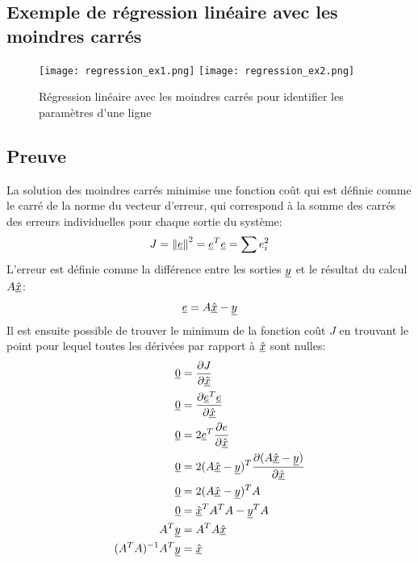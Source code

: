 \subsection{Exemple de régression linéaire avec les moindres carrés}

\begin{figure}[htbp]
	\centering
	\texttt{[image: regression\_ex1.png]}
	\texttt{[image: regression\_ex2.png]}
	\caption{Régression linéaire avec les moindres carrés pour identifier les paramètres d'une ligne}
	\label{fig:regression-ex1}
\end{figure}


\subsection{Preuve}

La solution des moindres carrés minimise une fonction coût qui est définie comme le carré de la norme du vecteur d'erreur, qui correspond à la somme des carrés des erreurs individuelles pour chaque sortie du système:
\begin{align}
	J = \left\| \underline{e} \right\|^2  = \underline{e}^T\underline{e} = \sum{ e_i^2}
\end{align}
L'erreur est définie comme la différence entre les sorties $\underline{y}$ et le résultat du calcul $A \underline{\hat{x}}$:
\begin{align}
	\underline{e} = A \underline{\hat{x}} - \underline{y}
\end{align}
Il est ensuite possible de trouver le minimum de la fonction coût $J$ en trouvant le point pour lequel toutes les dérivées par rapport à $\underline{\hat{x}}$ sont nulles:
\begin{align}
	\underline{0} &= \frac{\partial J}{\partial \underline{\hat{x}}} \\
	\underline{0} &= \frac{\partial \underline{e}^T\underline{e}}{\partial \underline{\hat{x}}} \\
	\underline{0} &= 2 \underline{e}^T \frac{\partial e }{\partial \underline{\hat{x}}} \\
	\underline{0} &= 2 ( A \underline{\hat{x}} -\underline{y} )^T \frac{\partial (A \underline{\hat{x}} -\underline{y}) }{\partial \underline{\hat{x}}} \\
	\underline{0} &= 2 ( A \underline{\hat{x}} -\underline{y}  )^T A  \\
	\underline{0} &=  \underline{\hat{x}}^T A^T A  - \underline{y}^T A   \\
	A^T \underline{y} &= A^T A \underline{\hat{x}} \\
	(A^T A)^{-1} A^T \underline{y} &= \underline{\hat{x}}
\end{align}

